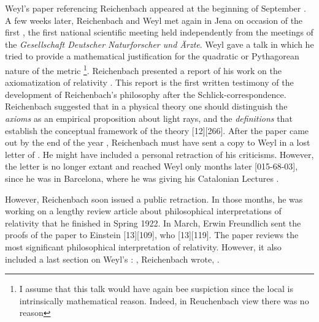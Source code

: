 \documentclass[draft]{article}
\begin{document}
Weyl's paper referencing Reichenbach appeared at the beginning of September \citep{Weyl1921e}. A few weeks later, Reichenbach and Weyl met again in Jena on occasion of the first  , the first national scientific meeting held independently from the meetings of the \textit{Gesellschaft Deutscher Naturforscher und Ärzte}. Weyl gave a talk in which he tried to provide a mathematical justification for the quadratic or Pythagorean nature of the metric \citep{Weyl1921f}\footnote{I assume that this talk would have again bee suspiction since the local is intrinsically mathematical reason. Indeed, in Reuchenbach view there was no reason}. Reichenbach presented a report of his work on the axiomatization of relativity \citep{Reichenbach1921d}. This report is the first written testimony of the development of Reichenbach's philosophy after the Schlick-correspondence. Reichenbach suggested that in a physical theory one should distinguish the \emph{axioms} as an empirical proposition about light rays, \rac\etc and the \emph{definitions} that establish the conceptual framework of the theory [12][266]. After the paper came out by the end of the year \citep{Reichenbach1921d}, Reichenbach must have sent a copy to Weyl in a lost letter of . He might have included a personal retraction of his criticisms. However, the letter is no longer extant and reached Weyl only months later [015-68-03], since he was in Barcelona, where he was giving his Catalonian Lectures \citep{Weyl1923}.

However, Reichenbach soon issued a public retraction. In those months, he was working on a lengthy review article about philosophical interpretations of relativity that he finished in Spring 1922. In March, Erwin Freundlich sent the proofs of the paper  to Einstein [13][109], who  [13][119]. The paper reviews the most significant philosophical interpretation of relativity. However, it also included a last section on Weyl's \uft: , Reichenbach wrote,  \citep[365]{Reichenbach1922a}.
\end{document}

